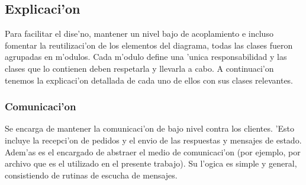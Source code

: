\clearpage

\clearpage

\clearpage

\clearpage

\clearpage



\subsection{Explicaci'on}
Para facilitar el dise'no, mantener un nivel bajo de acoplamiento e incluso fomentar la reutilizaci'on de los elementos del diagrama, todas las clases fueron agrupadas en m'odulos. Cada m'odulo define una 'unica responsabilidad y las clases que lo contienen deben respetarla y llevarla a cabo. A continuaci'on tenemos la explicaci'on detallada de cada uno de ellos con sus clases relevantes.


\subsubsection{Comunicaci'on}
Se encarga de mantener la comunicaci'on de bajo nivel contra los clientes. 'Esto incluye la recepci'on de pedidos y el envio de las respuestas y mensajes de estado. Adem'as es el encargado de abstraer el medio de comunicaci'on (por ejemplo, por archivo que es el utilizado en el presente trabajo). Su l'ogica es simple y general, consistiendo de rutinas de escucha de mensajes.


